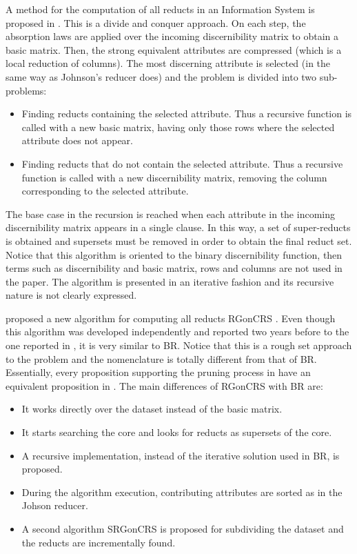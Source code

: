 \documentclass[authoryear,11pt]{elsarticle}
\makeatletter
\newcommand{\setword}[2]{%
  \phantomsection
  #1\def\@currentlabel{\unexpanded{#1}}\label{#2}%
}
\makeatother
\begin{document}
  A method for the computation of all reducts in an Information System is proposed in
  \citep{Starzyk99,Starzyk00}.
  This is a divide and conquer approach. On each step, the absorption laws are applied over the incoming
  discernibility matrix to obtain a basic matrix. Then, the strong equivalent attributes are compressed
  (which is a local reduction of columns). The most discerning attribute is selected (in the same way as 
  Johnson's reducer does) and the problem is divided into two sub-problems: 
  \begin{itemize}
  \item Finding reducts containing the selected attribute. Thus a recursive function is called with a new basic 
  matrix, having only those rows where the selected attribute does not appear.
  \item Finding reducts that do not contain the selected attribute. Thus a recursive function is called with a new 
  discernibility matrix, removing the column corresponding to the selected attribute.
  \end{itemize}
  The base case in the recursion is reached when each attribute in the incoming discernibility matrix appears 
  in a single clause. In this way, a set of super-reducts is obtained and supersets must be removed in order 
  to obtain the final reduct set.
  Notice that this algorithm is oriented to the binary discernibility function, then 
  terms such as discernibility and basic matrix, rows and columns are not used in the paper. The
  algorithm is presented in an iterative fashion and its recursive nature is not clearly expressed.
  
  \cite{WangP07} proposed a new algorithm for computing all reducts \setword{RGonCRS}{RGonCRS}. 
  Even though this algorithm was developed independently and reported two years before to the one 
  reported in \linebreak \citep{Lias09}, it is very 
  similar to BR. Notice that this is a rough set approach to the problem and the nomenclature is totally 
  different from that of BR. Essentially, every proposition supporting the pruning process in \citep{WangP07} 
  have an equivalent proposition in \citep{Lias09}. The main differences of RGonCRS with BR are:
  \begin{itemize}
  \item It works directly over the dataset instead of the basic matrix.
  \item It starts searching the core and looks for reducts as supersets of the core.
  \item A recursive implementation, instead of the iterative solution used in BR, is proposed.
  \item During the algorithm execution, contributing attributes are sorted as in the Johson reducer.
  \item A second algorithm \setword{SRGonCRS}{SRGonCRS} is proposed for subdividing the dataset and the reducts are
  		incrementally found.
  \end{itemize}
  
\end{document}
